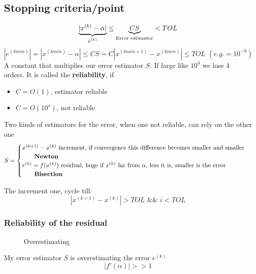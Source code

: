 \subsection{Stopping criteria/point}
$$\underlabel{|x^{(k)}-\alpha|}{$e^{(k)}$}\leq \underlabel{CS}{Error estimator}<TOL$$
$$
\left|e^{(kmin)}\right|=\left|x^{(kmin)}-\alpha\right|\leq CS=C\left|x^{(kmin+1)}-x^{(kmin)}\right|\leq TOL\,\,(e.g.=10^{-9})
$$
A constant that multiplies our error estimator $S$. If large like $10^4$ we lose 4 orders. It is called the \textbf{reliability}, if
\begin{itemize}
    \item $C=O(1)$, estimator reliable
    \item $C=O(10^s)$, not reliable
\end{itemize}
Two kinds of estimators for the error, when one not reliable, can rely on the other one
$$
S=
\begin{cases}
    x^{(k+1)}-x^{(k)}\text{ increment, if convergence this difference becomes smaller and smaller}\\
    \qquad\text{\textbf{Newton}}\\
    r^{(k)}=f(x^{(k)})\text{ residual, huge if $x^{(k)}$ far from $\alpha$, less it is, smaller is the error}\\
    \qquad\text{\textbf{Bisection}}
\end{cases}
$$

The increment one, cycle till:
$$|x^{(k+1)}-x^{(k)}|>TOL\,\,\&\&\,\,i<TOL$$

\pagebreak

\subsubsection{Reliability of the residual}
\begin{figure}[!ht]
    \begin{minipage}{\linewidth}
        \centering
        \caption{Overestimating}
    \end{minipage}
\end{figure}
My error estimator $S$ is overestimating the error $e^{(k)}$
$$|f'(\alpha)| >> 1$$

